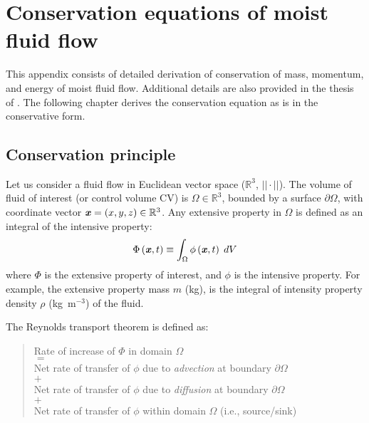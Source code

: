 \chapter{Conservation equations of moist fluid flow}
\label{app:conservation}

This appendix consists of detailed derivation of conservation of mass, momentum, and energy of moist fluid flow. Additional details are also provided in the thesis of \cite{Defraeye2011}. The following chapter derives the conservation equation as is in the conservative form. 

\section{Conservation principle}
\label{sec:Conservationprinciple}
Let us consider a fluid flow in Euclidean vector space ($\mathbb{R}^3$, $||\cdot||$). The volume of fluid of interest (or control volume CV) is $\Omega \in \mathbb{R}^3$, bounded by a surface $\partial\Omega$, with coordinate vector $\textbf{\textit{x}} = (x,y,z) \in \mathbb{R}^3$. Any extensive property in $\Omega$ is defined as an integral of the intensive property:
\begin{equation}
\Phi \left( \textbf{\textit{x}},t \right) \equiv \int_\Omega  \phi  \left( \textbf{\textit{x}},t \right)\;dV
\end{equation}
where $\Phi$ is the extensive property of interest, and $\phi$ is the intensive property. For example, the extensive property mass $m$ (kg), is the integral of intensity property density $\rho$ (kg~m$^{-3}$) of the fluid. 

The Reynolds transport theorem is defined as:
\begin{quote}
	\centering
	Rate of increase of $\Phi$ in domain $\Omega$\\
	$=$\\
	Net rate of transfer of $\phi$ due to \textit{advection} at boundary $\partial \Omega$\\
	$+$\\
	Net rate of transfer of $\phi$ due to \textit{diffusion} at boundary $\partial \Omega$\\
$+$\\	
	Net rate of transfer of $\phi$ within domain $\Omega$ (i.e., source/sink)
\end{quote}

